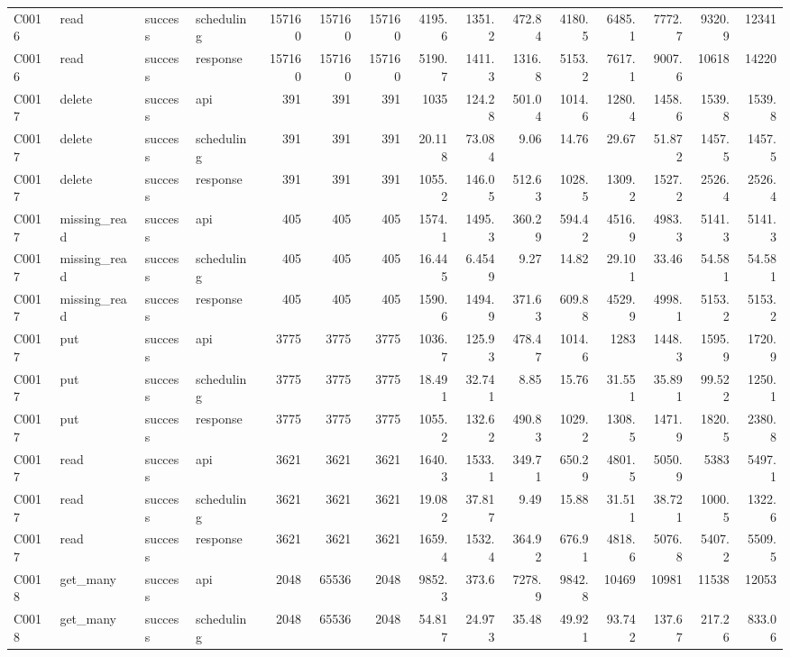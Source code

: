 \begin{landscape}
\begin{longtable}{llllrrrrrrrrrrr}
C0016 & read & success & scheduling & 157160 & 157160 & 157160 & 4195.6 & 1351.2 & 472.84 & 4180.5 & 6485.1 & 7772.7 & 9320.9 & 12341\\
C0016 & read & success & response & 157160 & 157160 & 157160 & 5190.7 & 1411.3 & 1316.8 & 5153.2 & 7617.1 & 9007.6 & 10618 & 14220\\
C0017 & delete & success & api & 391 & 391 & 391 & 1035 & 124.28 & 501.04 & 1014.6 & 1280.4 & 1458.6 & 1539.8 & 1539.8\\
C0017 & delete & success & scheduling & 391 & 391 & 391 & 20.118 & 73.084 & 9.06 & 14.76 & 29.67 & 51.872 & 1457.5 & 1457.5\\
C0017 & delete & success & response & 391 & 391 & 391 & 1055.2 & 146.05 & 512.63 & 1028.5 & 1309.2 & 1527.2 & 2526.4 & 2526.4\\
C0017 & missing\_\allowbreak{}read & success & api & 405 & 405 & 405 & 1574.1 & 1495.3 & 360.29 & 594.42 & 4516.9 & 4983.3 & 5141.3 & 5141.3\\
C0017 & missing\_\allowbreak{}read & success & scheduling & 405 & 405 & 405 & 16.445 & 6.4549 & 9.27 & 14.82 & 29.101 & 33.46 & 54.581 & 54.581\\
C0017 & missing\_\allowbreak{}read & success & response & 405 & 405 & 405 & 1590.6 & 1494.9 & 371.63 & 609.88 & 4529.9 & 4998.1 & 5153.2 & 5153.2\\
C0017 & put & success & api & 3775 & 3775 & 3775 & 1036.7 & 125.93 & 478.47 & 1014.6 & 1283 & 1448.3 & 1595.9 & 1720.9\\
C0017 & put & success & scheduling & 3775 & 3775 & 3775 & 18.491 & 32.741 & 8.85 & 15.76 & 31.551 & 35.891 & 99.522 & 1250.1\\
C0017 & put & success & response & 3775 & 3775 & 3775 & 1055.2 & 132.62 & 490.83 & 1029.2 & 1308.5 & 1471.9 & 1820.5 & 2380.8\\
C0017 & read & success & api & 3621 & 3621 & 3621 & 1640.3 & 1533.1 & 349.71 & 650.29 & 4801.5 & 5050.9 & 5383 & 5497.1\\
C0017 & read & success & scheduling & 3621 & 3621 & 3621 & 19.082 & 37.817 & 9.49 & 15.88 & 31.511 & 38.721 & 1000.5 & 1322.6\\
C0017 & read & success & response & 3621 & 3621 & 3621 & 1659.4 & 1532.4 & 364.92 & 676.91 & 4818.6 & 5076.8 & 5407.2 & 5509.5\\
C0018 & get\_\allowbreak{}many & success & api & 2048 & 65536 & 2048 & 9852.3 & 373.6 & 7278.9 & 9842.8 & 10469 & 10981 & 11538 & 12053\\
C0018 & get\_\allowbreak{}many & success & scheduling & 2048 & 65536 & 2048 & 54.817 & 24.973 & 35.48 & 49.921 & 93.742 & 137.67 & 217.26 & 833.06\\

\end{longtable}
\end{landscape}

